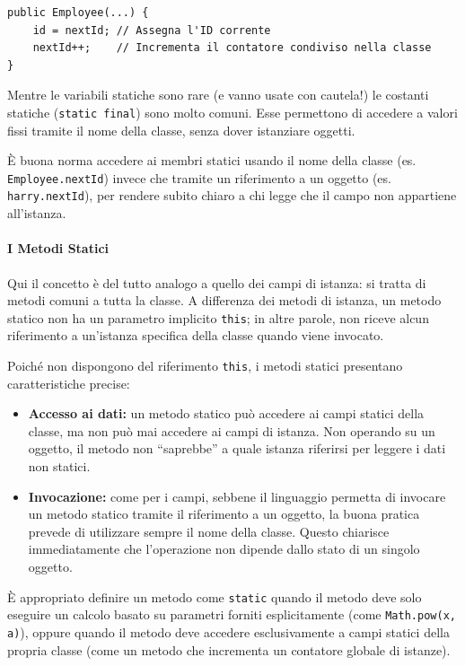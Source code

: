 \begin{lstlisting}[caption={Utilizzo di un campo statico nel costruttore}]
public Employee(...) {
    id = nextId; // Assegna l'ID corrente
    nextId++;    // Incrementa il contatore condiviso nella classe
}
\end{lstlisting}

Mentre le variabili statiche sono rare (e vanno usate con cautela!) le costanti statiche (\texttt{static final}) sono molto comuni. Esse permettono di accedere a valori fissi tramite il nome della classe, senza dover istanziare oggetti.

\begin{observation}
    È buona norma accedere ai membri statici usando il nome della classe (es. \texttt{Employee.nextId}) invece che tramite un riferimento a un oggetto (es. \texttt{harry.nextId}), per rendere subito chiaro a chi legge che il campo non appartiene all'istanza.
\end{observation}

\paragraph{I Metodi Statici}

Qui il concetto è del tutto analogo a quello dei campi di istanza: si tratta di metodi comuni a tutta la classe. A differenza dei metodi di istanza, un metodo statico non ha un parametro implicito \texttt{this}; in altre parole, non riceve alcun riferimento a un'istanza specifica della classe quando viene invocato.

Poiché non dispongono del riferimento \texttt{this}, i metodi statici presentano caratteristiche precise:
\begin{itemize}
    \item \textbf{Accesso ai dati:} un metodo statico può accedere ai campi statici della classe, ma non può mai accedere ai campi di istanza. Non operando su un oggetto, il metodo non ``saprebbe'' a quale istanza riferirsi per leggere i dati non statici.
    \item \textbf{Invocazione:} come per i campi, sebbene il linguaggio permetta di invocare un metodo statico tramite il riferimento a un oggetto, la buona pratica prevede di utilizzare sempre il nome della classe. Questo chiarisce immediatamente che l'operazione non dipende dallo stato di un singolo oggetto.
\end{itemize}


È appropriato definire un metodo come \texttt{static} quando il metodo deve solo eseguire un calcolo basato su parametri forniti esplicitamente (come \texttt{Math.pow(x, a)}), oppure quando il metodo deve accedere esclusivamente a campi statici della propria classe (come un metodo che incrementa un contatore globale di istanze).

